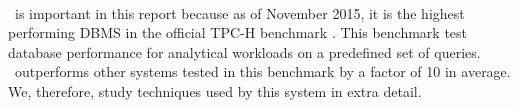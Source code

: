 \paragraph{\exasol}
\label{par:exasol}
\exasol~is important in this report because as of November 2015, it is the highest performing DBMS in the official TPC-H benchmark \cite{noauthor_undated-vr}. This benchmark test database performance for analytical workloads on a predefined set of queries. \exasol~outperforms other systems tested in this benchmark by a factor of 10 in average. We, therefore, study techniques used by this system in extra detail.




